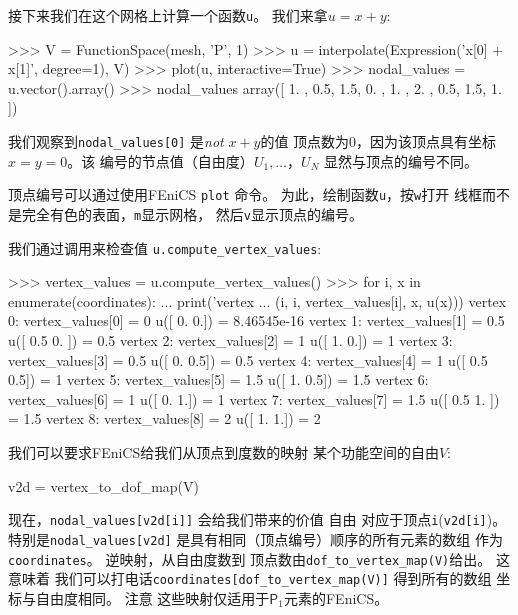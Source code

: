 接下来我们在这个网格上计算一个函数\texttt{u}。 我们来拿$u=x+y$:

\begin{python}
>>> V = FunctionSpace(mesh, 'P', 1)
>>> u = interpolate(Expression('x[0] + x[1]', degree=1), V)
>>> plot(u, interactive=True)
>>> nodal_values = u.vector().array()
>>> nodal_values
array([ 1. ,  0.5,  1.5,  0. ,  1. ,  2. ,  0.5,  1.5,  1. ])
\end{python}
我们观察到\verb!nodal_values[0]! 是\emph{not} $x+y$的值
顶点数为0，因为该顶点具有坐标$x=y=0$。该
编号的节点值（自由度）$U_1,\ldots，U_{N}$
显然与顶点的编号不同。

顶点编号可以通过使用FEniCS \texttt{plot}
命令。 为此，绘制函数\texttt{u}，按\texttt{w}打开
线框而不是完全有色的表面，\texttt{m}显示网格，
然后\texttt{v}显示顶点的编号。

\vspace{6mm}


\vspace{6mm}


我们通过调用来检查值
\verb!u.compute_vertex_values!:

\begin{python}
>>> vertex_values = u.compute_vertex_values()
>>> for i, x in enumerate(coordinates):
...     print('vertex %
...           (i, i, vertex_values[i], x, u(x)))
vertex 0: vertex_values[0] = 0          u([ 0.  0.]) = 8.46545e-16
vertex 1: vertex_values[1] = 0.5        u([ 0.5  0. ]) = 0.5
vertex 2: vertex_values[2] = 1          u([ 1.  0.]) = 1
vertex 3: vertex_values[3] = 0.5        u([ 0.   0.5]) = 0.5
vertex 4: vertex_values[4] = 1          u([ 0.5  0.5]) = 1
vertex 5: vertex_values[5] = 1.5        u([ 1.   0.5]) = 1.5
vertex 6: vertex_values[6] = 1          u([ 0.  1.]) = 1
vertex 7: vertex_values[7] = 1.5        u([ 0.5  1. ]) = 1.5
vertex 8: vertex_values[8] = 2          u([ 1.  1.]) = 2
\end{python}


我们可以要求FEniCS给我们从顶点到度数的映射
某个功能空间的自由$V$:

\begin{python}
v2d = vertex_to_dof_map(V)
\end{python}
现在，\verb!nodal_values[v2d[i]]! 会给我们带来的价值
自由
对应于顶点\texttt{i}(\texttt{v2d[i]})。 特别是\verb!nodal_values[v2d]!
是具有相同（顶点编号）顺序的所有元素的数组
作为\texttt{coordinates}。 逆映射，从自由度数到
顶点数由\verb!dof_to_vertex_map(V)!给出。 这意味着
我们可以打电话\verb!coordinates[dof_to_vertex_map(V)]! 得到所有的数组
坐标与自由度相同。 注意
这些映射仅适用于$\mathsf{P}_1$元素的FEniCS。

